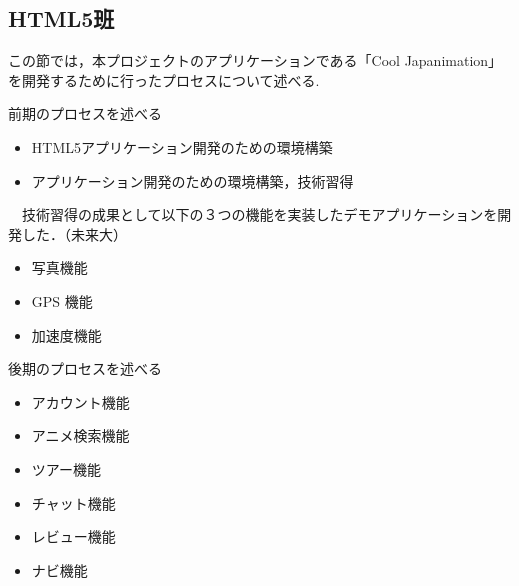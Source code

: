 \subsection{HTML5班}
\par この節では，本プロジェクトのアプリケーションである「Cool Japanimation」を開発するために行ったプロセスについて述べる.
\par 前期のプロセスを述べる
\begin{itemize}
\item HTML5アプリケーション開発のための環境構築
\item アプリケーション開発のための環境構築，技術習得
\end{itemize}
\par 　技術習得の成果として以下の３つの機能を実装したデモアプリケーションを開発した．（未来大）
\begin{itemize}
\item 写真機能
\item GPS 機能
\item 加速度機能
\end{itemize}
\par 後期のプロセスを述べる
\begin{itemize}
\item アカウント機能
\item アニメ検索機能 
\item ツアー機能
\item チャット機能
\item レビュー機能
\item ナビ機能
\end{itemize}
